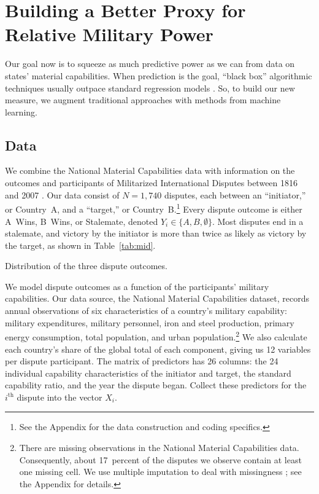 
\section{Building a Better Proxy for Relative Military Power}
\label{sec:methods}

Our goal now is to squeeze as much predictive power as we can from data on states' material capabilities.
When prediction is the goal, ``black box'' algorithmic techniques usually outpace standard regression models \citep{Breiman:2001fd}.
So, to build our new measure, we augment traditional approaches with methods from machine learning.

\subsection{Data}

We combine the National Material Capabilities data \citep{singer1972} with information on the outcomes and participants of Militarized International Disputes between 1816 and 2007 \citep{Palmer:2015hp}.
Our data consist of $N = 1{,}740$ disputes, each between an ``initiator,'' or Country~A, and a ``target,'' or Country~B.\footnote{%
  See the Appendix for the data construction and coding specifics.
}
Every dispute outcome is either A~Wins, B~Wins, or Stalemate, denoted $Y_i \in \{A, B, \emptyset\}$.
Most disputes end in a stalemate, and victory by the initiator is more than twice as likely as victory by the target, as shown in Table~\ref{tab:mid}.

\begin{table}[htp]
  \centering
  
  \caption{
    Distribution of the three dispute outcomes.
  }
  \label{tab:mid}
\end{table}

We model dispute outcomes as a function of the participants' military capabilities.
Our data source, the National Material Capabilities dataset, records annual observations of six characteristics of a country's military capability: military expenditures, military personnel, iron and steel production, primary energy consumption, total population, and urban population.\footnote{%
  There are missing observations in the National Material Capabilities data.
  Consequently, about 17~percent of the disputes we observe contain at least one missing cell.
  We use multiple imputation to deal with missingness \citep{honaker_what_2010}; see the Appendix for details.
}
We also calculate each country's share of the global total of each component, giving us 12 variables per dispute participant.
The matrix of predictors has 26 columns: the 24 individual capability characteristics of the initiator and target, the standard capability ratio, and the year the dispute began.
Collect these predictors for the $i^{\text{th}}$ dispute into the vector $X_i$.

